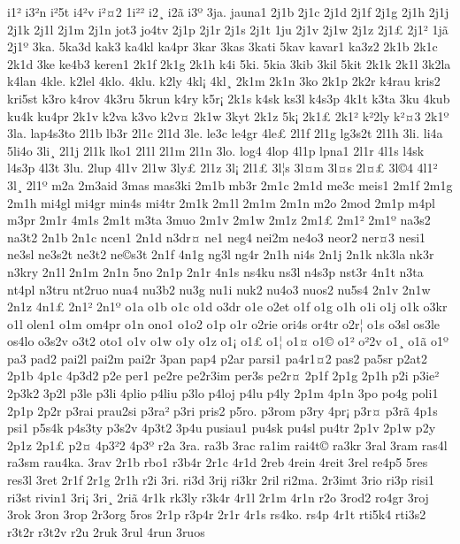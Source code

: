{i1^^b2
i3^^b2n
i^^b25t
i4^^b2v
i^^b2^^a42
1i^^b2^^b2
i2^^b8
i2^^e3
i3^^ba
3ja.
jauna1
2j1b
2j1c
2j1d
2j1f
2j1g
2j1h
2j1j
2j1k
2j1l
2j1m
2j1n
jot3
jo4tv
2j1p
2j1r
2j1s
2j1t
1ju
2j1v
2j1w
2j1z
2j1^^a3
2j1^^b2
1j^^e3
2j1^^ba
3ka.
5ka3d
kak3
ka4kl
ka4pr
3kar
3kas
3kati
5kav
kavar1
ka3z2
2k1b
2k1c
2k1d
3ke
ke4b3
keren1
2k1f
2k1g
2k1h
k4i
5ki.
5kia
3kib
3kil
5kit
2k1k
2k1l
3k2la
k4lan
4kle.
k2lel
4klo.
4klu.
k2ly
4kl^^a1
4kl^^b8
2k1m
2k1n
3ko
2k1p
2k2r
k4rau
kris2
kri5st
k3ro
k4rov
4k3ru
5krun
k4ry
k5r^^a1
2k1s
k4sk
ks3l
k4s3p
4k1t
k3ta
3ku
4kub
ku4k
ku4pr
2k1v
k2va
k3vo
k2v^^a4
2k1w
3kyt
2k1z
5k^^a1
2k1^^a3
2k1^^b2
k^^b22ly
k^^b2^^a43
2k1^^ba
3la.
lap4s3to
2l1b
lb3r
2l1c
2l1d
3le.
le3c
le4gr
4le^^a3
2l1f
2l1g
lg3s2t
2l1h
3li.
li4a
5li4o
3li^^b8
2l1j
2l1k
lko1
2l1l
2l1m
2l1n
3lo.
log4
4lop
4l1p
lpna1
2l1r
4l1s
l4sk
l4s3p
4l3t
3lu.
2lup
4l1v
2l1w
3ly^^a3
2l1z
3l^^a1
2l1^^a3
3l^^a6s
3l^^a4m
3l^^a4s
2l^^a4^^a3
3l^^a94
4l1^^b2
3l^^b8
2l1^^ba
m2a
2m3aid
3mas
mas3ki
2m1b
mb3r
2m1c
2m1d
me3c
meis1
2m1f
2m1g
2m1h
mi4gl
mi4gr
min4s
mi4tr
2m1k
2m1l
2m1m
2m1n
m2o
2mod
2m1p
m4pl
m3pr
2m1r
4m1s
2m1t
m3ta
3muo
2m1v
2m1w
2m1z
2m1^^a3
2m1^^b2
2m1^^ba
na3s2
na3t2
2n1b
2n1c
ncen1
2n1d
n3dr^^a4
ne1
neg4
nei2m
ne4o3
neor2
ner^^a43
nesi1
ne3sl
ne3s2t
ne3t2
ne^^a9s3t
2n1f
4n1g
ng3l
ng4r
2n1h
ni4s
2n1j
2n1k
nk3la
nk3r
n3kry
2n1l
2n1m
2n1n
5no
2n1p
2n1r
4n1s
ns4ku
ns3l
n4s3p
nst3r
4n1t
n3ta
nt4pl
n3tru
nt2ruo
nua4
nu3b2
nu3g
nu1i
nuk2
nu4o3
nuos2
nu5s4
2n1v
2n1w
2n1z
4n1^^a3
2n1^^b2
2n1^^ba
o1a
o1b
o1c
o1d
o3dr
o1e
o2et
o1f
o1g
o1h
o1i
o1j
o1k
o3kr
o1l
olen1
o1m
om4pr
o1n
ono1
o1o2
o1p
o1r
o2rie
ori4s
or4tr
o2r^^a6
o1s
o3sl
os3le
os4lo
o3s2v
o3t2
oto1
o1v
o1w
o1y
o1z
o1^^a1
o1^^a3
o1^^a6
o1^^a4
o1^^a9
o1^^b2
o^^b22v
o1^^b8
o1^^e3
o1^^ba
pa3
pad2
pai2l
pai2m
pai2r
3pan
pap4
p2ar
parsi1
pa4r1^^a42
pas2
pa5sr
p2at2
2p1b
4p1c
4p3d2
p2e
per1
pe2re
pe2r3im
per3s
pe2r^^a4
2p1f
2p1g
2p1h
p2i
p3ie^^b2
2p3k2
3p2l
p3le
p3li
4plio
p4liu
p3lo
p4loj
p4lu
p4ly
2p1m
4p1n
3po
po4g
poli1
2p1p
2p2r
p3rai
prau2si
p3ra^^b2
p3ri
pris2
p5ro.
p3rom
p3ry
4pr^^a1
p3r^^a4
p3r^^e3
4p1s
psi1
p5s4k
p4s3ty
p3s2v
4p3t2
3p4u
pusiau1
pu4sk
pu4sl
pu4tr
2p1v
2p1w
p2y
2p1z
2p1^^a3
p2^^a4
4p3^^b22
4p3^^ba
r2a
3ra.
ra3b
3rac
ra1im
rai4t^^a9
ra3kr
3ral
3ram
ras4l
ra3sm
rau4ka.
3rav
2r1b
rbo1
r3b4r
2r1c
4r1d
2reb
4rein
4reit
3rel
re4p5
5res
res3l
3ret
2r1f
2r1g
2r1h
r2i
3ri.
ri3d
3rij
ri3kr
2ril
ri2ma.
2r3imt
3rio
ri3p
risi1
ri3st
rivin1
3ri^^a1
3ri^^b8
2ri^^e3
4r1k
rk3ly
r3k4r
4r1l
2r1m
4r1n
r2o
3rod2
ro4gr
3roj
3rok
3ron
3rop
2r3org
5ros
2r1p
r3p4r
2r1r
4r1s
rs4ko.
rs4p
4r1t
rti5k4
rti3s2
r3t2r
r3t2v
r2u
2ruk
3rul
4run
3ruos
}
